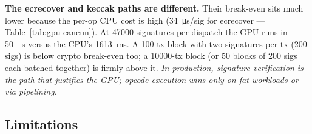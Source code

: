 \textbf{The ecrecover and keccak paths are different.} Their break-even
sits much lower because the per-op CPU cost is high
(\SI{34}{\micro\second}/sig for ecrecover --- Table~\ref{tab:gpu-cancun}).
At \num{47000} signatures per dispatch the GPU runs in \SI{50}{\milli
\second} versus the CPU's \SI{1613}{\milli\second}. A 100-tx block with
two signatures per tx (200 sigs) is below crypto break-even too; a
\num{10000}-tx block (or \num{50} blocks of \num{200} sigs each
batched together) is firmly above it. \emph{In production, signature
verification is the path that justifies the GPU; opcode execution wins
only on fat workloads or via pipelining.}

\subsection{Limitations}
\label{sec:cevm-limitations}

